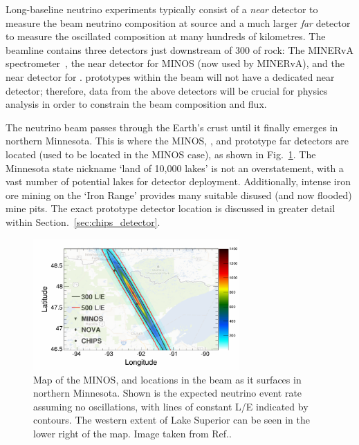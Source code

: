Long-baseline neutrino experiments typically consist of a \emph{near} detector to measure the beam
neutrino composition at source and a much larger \emph{far} detector to measure the oscillated
composition at many hundreds of kilometres. The \numi beamline contains three detectors just
downstream of \unit{300}{} of rock: The MINERvA spectrometer~\cite{mcfarland2006}, the
near detector for MINOS (now used by MINERvA), and the near detector for \nova. \chips prototypes
within the \numi beam will not have a dedicated near detector; therefore, data from the above
detectors will be crucial for physics analysis in order to constrain the beam composition and
flux.

The \numi neutrino beam passes through the Earth's crust until it finally emerges in northern
Minnesota. This is where the MINOS, \nova, and prototype \chips far detectors are located (used to
be located in the MINOS case), as shown in Fig.~\ref{fig:numi_map}. The Minnesota state nickname
`land of 10,000 lakes' is not an overstatement, with a vast number of potential lakes for \chips
detector deployment. Additionally, intense iron ore mining on the `Iron Range' provides many
suitable disused (and now flooded) mine pits. The exact \chipsfive prototype detector location is
discussed in greater detail within Section.~\ref{sec:chips_detector}.

\begin{figure} %
    \includegraphics[width=0.7\textwidth]{diagrams/4-chips/numi_map.png}
    \caption[Map of detector locations in the \numi beam]
    {Map of the MINOS, \nova and \chips locations in the \numi beam as it surfaces in northern
        Minnesota. Shown is the expected neutrino event rate assuming no oscillations, with lines
        of constant L/E indicated by contours. The western extent of Lake Superior can be seen in
        the lower right of the map. Image taken from Ref.\cite{adamson2013}.}
    \label{fig:numi_map}
\end{figure}

